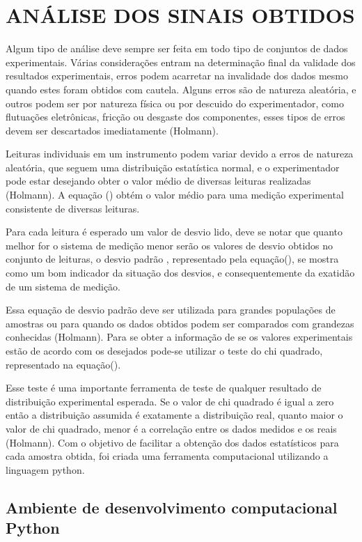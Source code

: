 \section{ANÁLISE DOS SINAIS OBTIDOS}

Algum tipo de análise deve sempre ser feita em todo tipo de conjuntos de dados experimentais. Várias considerações entram na determinação final da validade dos resultados experimentais, erros podem acarretar na invalidade dos dados mesmo quando estes foram obtidos com cautela. Alguns erros são de natureza aleatória, e outros podem ser por natureza física ou por descuido do experimentador, como flutuações eletrônicas, fricção ou desgaste dos componentes, esses tipos de erros devem ser descartados imediatamente (Holmann).

Leituras individuais em um instrumento podem variar devido a erros de natureza aleatória, que seguem uma distribuição estatística normal, e o experimentador pode estar desejando obter o valor médio de diversas leituras realizadas (Holmann). A equação () obtém o valor médio para uma medição experimental consistente de diversas leituras.

Para cada leitura é esperado um valor de desvio lido, deve se notar que quanto melhor for o sistema de medição menor serão os valores de desvio obtidos no conjunto de leituras, o desvio padrão , representado pela equação(), se mostra como um bom indicador da situação dos desvios, e consequentemente da exatidão de um sistema de medição.

Essa equação de desvio padrão deve ser utilizada para grandes populações de amostras ou para quando os dados obtidos podem ser comparados com grandezas conhecidas (Holmann). Para se obter a informação de se os valores experimentais estão de acordo com os desejados pode-se utilizar o teste do chi quadrado, representado na equação().

Esse teste é uma importante ferramenta de teste de qualquer resultado de distribuição experimental esperada. Se o valor de chi quadrado é igual a zero então a distribuição assumida é exatamente a distribuição real, quanto maior o valor de chi quadrado, menor é a correlação entre os dados medidos e os reais (Holmann). Com o objetivo de facilitar a obtenção dos dados estatísticos para cada amostra obtida, foi criada uma ferramenta computacional utilizando a linguagem python.

\subsection{Ambiente de desenvolvimento computacional Python}

